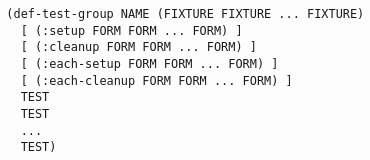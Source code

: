 \begin{verbatim}
  (def-test-group NAME (FIXTURE FIXTURE ... FIXTURE)
    [ (:setup FORM FORM ... FORM) ]
    [ (:cleanup FORM FORM ... FORM) ]
    [ (:each-setup FORM FORM ... FORM) ]
    [ (:each-cleanup FORM FORM ... FORM) ]
    TEST
    TEST
    ...
    TEST)
\end{verbatim}

